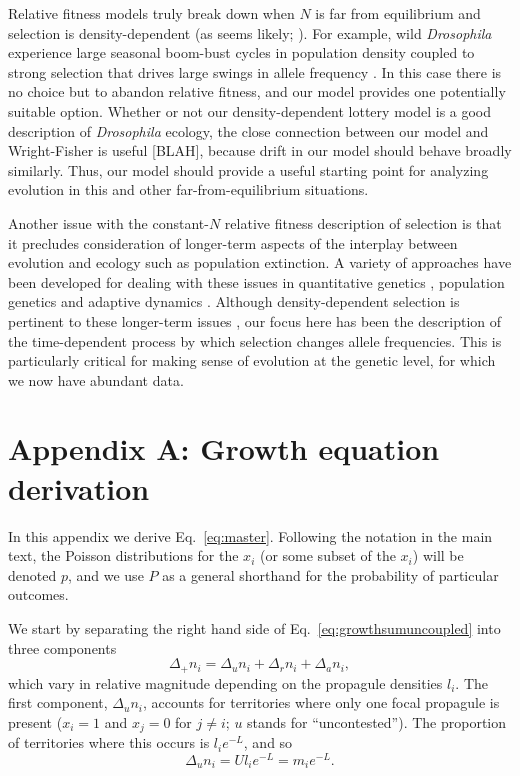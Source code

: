 \documentclass[12pt]{article}
\begin{document}
Relative fitness models truly break down when $N$ is far from equilibrium and selection is density-dependent (as seems likely; \citealt{travis_2013}). For example, wild \textit{Drosophila} experience large seasonal boom-bust cycles in population density coupled to strong selection that drives large swings in allele frequency \citep{bergland_14}. In this case there is no choice but to abandon relative fitness, and our model provides one potentially suitable option. Whether or not our density-dependent lottery model is a good description of \textit{Drosophila} ecology, the close connection between our model and Wright-Fisher is useful [BLAH], because drift in our model should behave broadly similarly. Thus, our model should provide a useful starting point for analyzing evolution in this and other far-from-equilibrium situations. 

Another issue with the constant-$N$ relative fitness description of selection is that it precludes consideration of longer-term aspects of the interplay between evolution and ecology such as population extinction. A variety of approaches have been developed for dealing with these issues in quantitative genetics \citep{burger1995evolution,engen_2013}, population genetics \citep{bertram2017predicting} and adaptive dynamics \citep{ferriere2013eco,dieckmann2004adaptive}. Although density-dependent selection is  pertinent to these longer-term issues \citep{travis_2013}, our focus here has been the description of the time-dependent process by which selection changes allele frequencies. This is particularly critical for making sense of evolution at the genetic level, for which we now have abundant data.



 

\section*{Appendix A: Growth equation derivation}

In this appendix we derive Eq.~\eqref{eq:master}. Following the notation in the main text, the Poisson distributions for the $x_i$ (or some subset of the $x_i$) will be denoted $p$, and we use $P$ as a general shorthand for the probability of particular outcomes.

We start by separating the right hand side of Eq.~\eqref{eq:growthsumuncoupled} into three components
\begin{equation}
\Delta_+ n_i = \Delta_u n_i+\Delta_r n_i+\Delta_a n_i,\label{eq:delt_decomp}
\end{equation}
which vary in relative magnitude depending on the propagule densities $l_i$. The first component, $\Delta_u n_i$, accounts for territories where only one focal propagule is present ($x_i=1$ and $x_j=0$ for $j\neq i$; $u$ stands for ``uncontested''). The proportion of territories where this occurs is $l_i e^{-L}$, and so 
\begin{equation}
\Delta_u n_i=Ul_i e^{-L}=m_i e^{-L}.
\end{equation}
\end{document}
